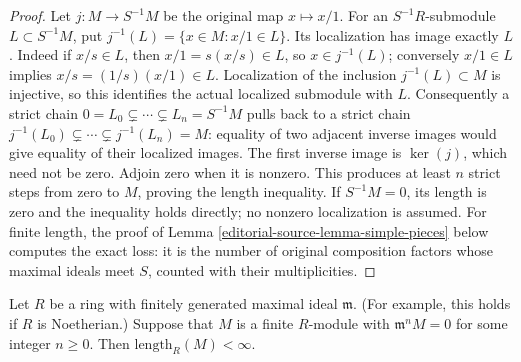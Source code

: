 \begin{proof}
Let $j:M\to S^{-1}M$ be the original map $x\mapsto x/1$.
For an $S^{-1}R$-submodule $L\subset S^{-1}M$, put
$j^{-1}(L)=\{x\in M:x/1\in L\}$. Its localization has image
exactly $L$. Indeed if $x/s\in L$, then $x/1=s(x/s)\in L$,
so $x\in j^{-1}(L)$; conversely $x/1\in L$ implies
$x/s=(1/s)(x/1)\in L$. Localization of the inclusion
$j^{-1}(L)\subset M$ is injective, so this identifies the actual
localized submodule with $L$.
Consequently a strict chain $0=L_0\subsetneq\cdots\subsetneq
L_n=S^{-1}M$ pulls back to a strict chain
$j^{-1}(L_0)\subsetneq\cdots\subsetneq j^{-1}(L_n)=M$:
equality of two adjacent inverse images would give equality of
their localized images. The first inverse image is $\ker(j)$,
which need not be zero. Adjoin zero when it is nonzero. This
produces at least $n$ strict steps from zero to $M$, proving
the length inequality. If $S^{-1}M=0$, its length is zero and
the inequality holds directly; no nonzero localization is assumed.
For finite length, the proof of Lemma \ref{editorial-source-lemma-simple-pieces}
below computes the exact loss: it is the number of original
composition factors whose maximal ideals meet $S$, counted
with their multiplicities.
\end{proof}

\begin{lemma}
\label{editorial-source-lemma-length-finite}
Let $R$ be a ring with finitely generated
maximal ideal $\mathfrak m$. (For example, this holds if $R$ is Noetherian.)
Suppose that $M$ is a finite $R$-module with
$\mathfrak m^n M  =  0$ for some integer $n\geq0$.
Then $\text{length}_R(M) < \infty$.
\end{lemma}

